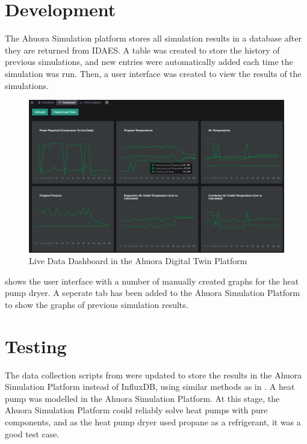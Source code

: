 \section{Development} \label{sec:recordinghistorydevelopment}

The Ahuora Simulation platform stores all simulation results in a database after they are returned from IDAES. A table was created to store the history of previous simulations, and new entries were automatically added each time the simulation was run. Then, a user interface was created to view the results of the simulations.

\begin{figure}
    \centering
    \includegraphics[width=\textwidth]{livedatadashboard.png}
    \caption{Live Data Dashboard in the Ahuora Digital Twin Platform}
    \label{fig:livedatadashboard}
\end{figure}

 shows the user interface with a number of manually created graphs for the heat pump dryer. A seperate tab has been added to the Ahuora Simulation Platform to show the graphs of previous simulation results. 


\section{Testing}

The data collection scripts from  were updated to store the results in the Ahuora Simulation Platform instead of InfluxDB, using similar methods as in . A heat pump was modelled in the Ahuora Simulation Platform. At this stage, the Ahuora Simulation Platform could reliably solve heat pumps with pure components, and as the heat pump dryer used propane as a refrigerant, it was a good test case. 


